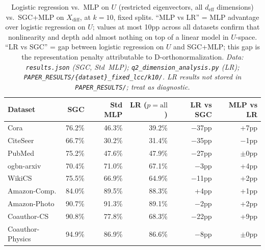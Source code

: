 \documentclass[11pt]{article}
\begin{document}
\begin{table}[H]
\centering\small\setlength{\tabcolsep}{5pt}
\caption{Logistic regression vs.\ MLP on $U$ (restricted eigenvectors, all $d_{\mathrm{eff}}$
dimensions) vs.\ SGC+MLP on $X_{\mathrm{diff}}$, at $k{=}10$, fixed splits.
``MLP vs LR'' = MLP advantage over logistic regression on $U$; values at most 10pp across
all datasets confirm that nonlinearity and depth add almost nothing on top of a
linear model in $U$-space.
``LR vs SGC'' = gap between logistic regression on $U$ and SGC+MLP;
this gap is the representation penalty attributable to D-orthonormalization.
\textit{\scriptsize Data: \texttt{results.json} (SGC, Std~MLP); \texttt{q2\_dimension\_analysis.py}
(LR); \texttt{PAPER\_RESULTS/\{dataset\}\_fixed\_lcc/k10/}.  LR results not stored in
\texttt{PAPER\_RESULTS/}; treat as diagnostic.}}
\label{tab:lr_vs_sgc}
\begin{tabular}{lrrrrr}
\toprule
Dataset & SGC & Std MLP & LR ($p{=}\mathrm{all}$) & LR vs SGC & MLP vs LR \\
\midrule
Cora             & 76.2\% & 46.3\% & 39.2\% & $-$37pp & +7pp \\
CiteSeer         & 66.7\% & 30.2\% & 31.4\% & $-$35pp & $-$1pp \\
PubMed           & 75.2\% & 47.6\% & 47.9\% & $-$27pp & $\pm$0pp \\
ogbn-arxiv       & 70.4\% & 71.0\% & 67.1\% & $-$3pp  & +4pp \\
WikiCS           & 75.5\% & 66.9\% & 64.9\% & $-$11pp & +2pp \\
Amazon-Comp.     & 84.0\% & 89.5\% & 88.3\% & +4pp    & +1pp \\
Amazon-Photo     & 90.7\% & 91.3\% & 89.1\% & $-$2pp  & +2pp \\
Coauthor-CS      & 90.8\% & 77.8\% & 68.3\% & $-$22pp & +9pp \\
Coauthor-Physics & 94.9\% & 86.9\% & 86.6\% & $-$8pp  & $\pm$0pp \\
\bottomrule
\end{tabular}
\end{table}
\end{document}
